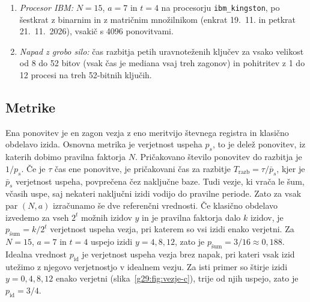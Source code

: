 \begin{enumerate}
Prevajanje celotnega vezja je počasno: pri $n = 4$ je trajalo 1,7\,s, pri $n = 5$ pa že 15\,s. Prevedemo zato le eno krmiljeno množenje. Vseh $2n$ množenj ima enako zgradbo in se razlikujejo le po konstanti $b$, zato trajajo približno enako dolgo. Čas ponovitve ocenimo kot $2n$-kratnik trajanja enega množenja, ki mu prištejemo branje kubitov (1,3\,$\mu$s) in čakanje med ponovitvami (250\,$\mu$s). Predpostavimo, da nobenega množenja ne preskočimo, saj je $a^{2^j} \equiv 1 \pmod N$ le, kadar je perioda potenca števila 2, kar je pri velikem $N$ redko. Pri $n = 4$ in $n = 5$ oceno preverimo s trajanjem celotnega prevedenega vezja.
\item \emph{Procesor IBM:} $N = 15$, $a = 7$ in $t = 4$ na procesorju \texttt{ibm\_kingston}, po šestkrat z binarnim in z matričnim množilnikom (enkrat 19.~11. in petkrat 21.~11.~2026), vsakič s 4096 ponovitvami.
\item \emph{Napad z grobo silo:} čas razbitja petih uravnoteženih ključev za vsako velikost od 8 do 52 bitov (vsak čas je mediana vsaj treh zagonov) in pohitritev z 1 do 12 procesi na treh 52-bitnih ključih.
\end{enumerate}

\subsection{Metrike}
\label{g29:sec:metrike}

Ena ponovitev je en zagon vezja z eno meritvijo števnega registra in klasično obdelavo izida. Osnovna metrika je verjetnost uspeha $p_s$, to je delež ponovitev, iz katerih dobimo pravilna faktorja $N$. Pričakovano število ponovitev do razbitja je $1/p_s$. Če je $\tau$ čas ene ponovitve, je pričakovani čas za razbitje $T_\text{razb} = \tau / \bar{p}_s$, kjer je $\bar{p}_s$ verjetnost uspeha, povprečena čez naključne baze. Tudi vezje, ki vrača le šum, včasih uspe, saj nekateri naključni izidi vodijo do pravilne periode. Zato za vsak par $(N, a)$ izračunamo še dve referenčni vrednosti. Če klasično obdelavo izvedemo za vseh $2^t$ možnih izidov $y$ in je pravilna faktorja dalo $k$ izidov, je $p_\text{šum} = k / 2^t$ verjetnost uspeha vezja, pri katerem so vsi izidi enako verjetni. Za $N = 15$, $a = 7$ in $t = 4$ uspejo izidi $y = 4, 8, 12$, zato je $p_\text{šum} = 3/16 \approx 0{,}188$. Idealna vrednost $p_\text{id}$ je verjetnost uspeha vezja brez napak, pri kateri vsak izid utežimo z njegovo verjetnostjo v idealnem vezju. Za isti primer so štirje izidi $y = 0, 4, 8, 12$ enako verjetni (slika~\ref{g29:fig:vezje-c}), trije od njih uspejo, zato je $p_\text{id} = 3/4$.

